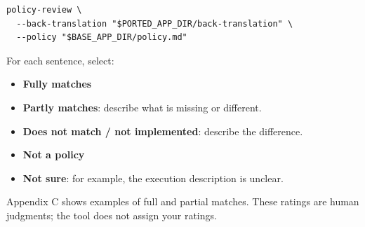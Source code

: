 \documentclass[10pt,a4paper]{article}
\begin{document}
\begin{lstlisting}
policy-review \
  --back-translation "$PORTED_APP_DIR/back-translation" \
  --policy "$BASE_APP_DIR/policy.md"
\end{lstlisting}

For each sentence, select:
\begin{itemize}
\item \textbf{Fully matches}
\item \textbf{Partly matches}: describe what is missing or different.
\item \textbf{Does not match / not implemented}: describe the difference.
\item \textbf{Not a policy}
\item \textbf{Not sure}: for example, the execution description is unclear.
\end{itemize}
Appendix C shows examples of full and partial matches. These ratings are human
judgments; the tool does not assign your ratings.
\end{document}
